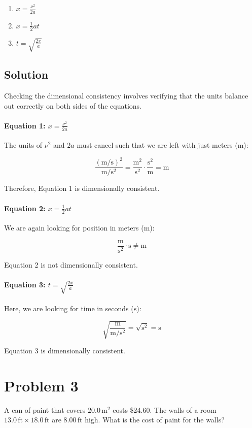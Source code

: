 \documentclass{article}
\newcommand{\meter}{\text{m}}
\newcommand{\second}{\text{s}}
\newcommand{\foot}{\text{ft}}
\begin{document}
\begin{enumerate}
    \item \( x = \frac{\nu^2}{2a} \)
    \item \( x = \frac{1}{2}at \)
    \item \( t = \sqrt{\frac{2x}{a}} \)
\end{enumerate}

\subsection*{Solution}
Checking the dimensional consistency involves verifying that the units balance out correctly on both sides of the equations.

\paragraph{Equation 1: \( x = \frac{\nu^2}{2a} \)}

The units of \( \nu^2 \) and \( 2a \) must cancel such that we are left with just meters (\(\meter\)):

\[
\frac{\left( \meter/\second \right)^2}{\meter/\second^2} = \frac{\meter^2}{\second^2} \cdot \frac{\second^2}{\meter} = \meter
\]

Therefore, Equation 1 is dimensionally consistent.

\paragraph{Equation 2: \( x = \frac{1}{2}at \)}

We are again looking for position in meters (\(\meter\)):

\[
\frac{\meter}{\second^2} \cdot \second \neq \meter
\]

Equation 2 is not dimensionally consistent.

\paragraph{Equation 3: \( t = \sqrt{\frac{2x}{a}} \)}

Here, we are looking for time in seconds (\(\second\)):

\[
\sqrt{\frac{\meter}{\meter/\second^2}} = \sqrt{\second^2} = \second
\]

Equation 3 is dimensionally consistent.

\section*{Problem 3}
A can of paint that covers \(20.0 \, \si{\meter^2}\) costs \$24.60. The walls of a room \(13.0 \, \si{\foot} \times 18.0 \, \si{\foot}\) are \(8.00 \, \si{\foot}\) high. What is the cost of paint for the walls?
\end{document}
